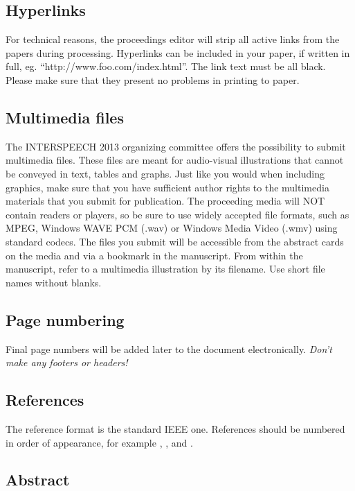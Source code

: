 \documentclass[a4paper]{article}
\begin{document}
\subsection{Hyperlinks}

For technical reasons, the proceedings editor will strip all active
links from the papers during processing. Hyperlinks can be included in
your paper, if written in full, eg. ``http://www.foo.com/index.html''.
The link text must be all black. Please make sure that they present no
problems in printing to paper.

\subsection{Multimedia files}

The INTERSPEECH 2013 organizing committee offers the possibility to submit
multimedia files. These files are meant for audio-visual illustrations that
cannot be conveyed in text, tables and graphs. Just like you would when
including graphics, make sure that you have sufficient author rights to the
multimedia materials that you submit for publication. The proceeding media
will NOT contain readers or players, so be sure to use widely accepted file
formats, such as MPEG, Windows WAVE PCM (.wav) or Windows Media Video
(.wmv) using standard codecs. The files you submit will be accessible from
the abstract cards on the media and via a bookmark in the manuscript. From
within the manuscript, refer to a multimedia illustration by its filename.
Use short file names without blanks.

\subsection{Page numbering}

Final page numbers will be added later to the document
electronically. 
{\em Don't make any footers or headers!}

\subsection{References}

The reference format is the standard IEEE one.
References should be numbered in order of appearance, 
for example \cite{ES1}, \cite{ES2}, and \cite{ES3}. 

\subsection{Abstract}
\end{document}
